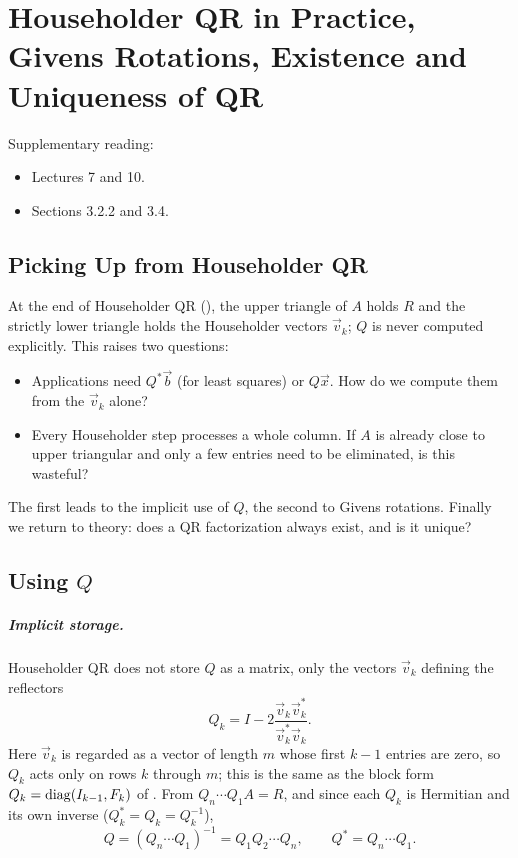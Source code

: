 \chapter{Householder QR in Practice, Givens Rotations, Existence and Uniqueness of QR}
\label{ch:qr}

Supplementary reading:
\begin{itemize}
  \item \cite{TB} Lectures 7 and 10.
  \item \cite{Demmel} Sections 3.2.2 and 3.4.
\end{itemize}

\section{Picking Up from Householder QR}

At the end of Householder QR (), the upper triangle of $A$ holds $R$ and the strictly lower triangle holds the Householder vectors $\vec{v}_k$; $Q$ is never computed explicitly. This raises two questions:
\begin{itemize}
  \item Applications need $Q^\ast\vec{b}$ (for least squares) or $Q\vec{x}$. How do we compute them from the $\vec{v}_k$ alone?
  \item Every Householder step processes a whole column. If $A$ is already close to upper triangular and only a few entries need to be eliminated, is this wasteful?
\end{itemize}
The first leads to the implicit use of $Q$, the second to Givens rotations. Finally we return to theory: does a QR factorization always exist, and is it unique?

\section{Using $Q$}

\paragraph{Implicit storage.} Householder QR does not store $Q$ as a matrix, only the vectors $\vec{v}_k$ defining the reflectors
\begin{equation}
  Q_k = I - 2\frac{\vec{v}_k\vec{v}_k^\ast}{\vec{v}_k^\ast\vec{v}_k}.
\end{equation}
Here $\vec{v}_k$ is regarded as a vector of length $m$ whose first $k - 1$ entries are zero, so $Q_k$ acts only on rows $k$ through $m$; this is the same as the block form $Q_k = \operatorname{diag}(I_{k-1}, F_k)$ of . From $Q_n \cdots Q_1A = R$, and since each $Q_k$ is Hermitian and its own inverse ($Q_k^\ast = Q_k = Q_k^{-1}$),
\begin{equation}
  Q = (Q_n \cdots Q_1)^{-1} = Q_1Q_2 \cdots Q_n, \qquad Q^\ast = Q_n \cdots Q_1.
\end{equation}


